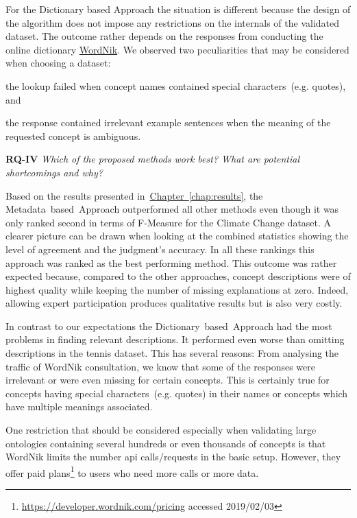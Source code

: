 For the Dictionary based Approach the situation is different because the design of the algorithm does not impose any restrictions on the internals of the validated dataset. The outcome rather depends on the responses from conducting the online dictionary \hyperref[sec:wordnik]{WordNik}. We observed two peculiarities that may be considered when choosing a dataset:
\begin{inparaenum}[i)]
	\item the lookup failed when concept names contained special characters~(e.g. quotes), and
	\item the response contained irrelevant example sentences when the meaning of the requested concept is ambiguous.
\end{inparaenum}


\textbf{RQ-IV} \emph{Which of the proposed methods work best? What are potential shortcomings and why?} 

Based on the results presented in~\hyperref[chap:results]{Chapter~\ref*{chap:results}}, the Metadata~based~Approach outperformed all other methods even though it was only ranked second in terms of F-Measure for the Climate Change dataset. A clearer picture can be drawn when looking at the combined statistics showing the level of agreement and the judgment's accuracy. In all these rankings this approach was ranked as the best performing method. This outcome was rather expected because, compared to the other approaches, concept descriptions were of highest quality while keeping the number of missing explanations at zero. Indeed, allowing expert participation produces qualitative results but is also very costly.  

In contrast to our expectations the Dictionary~based~Approach had the most problems in finding relevant descriptions. It performed even worse than omitting descriptions in the tennis dataset. This has several reasons: From analysing the traffic of WordNik consultation, we know that some of the responses were irrelevant or were even missing for certain concepts. This is certainly true for concepts having special characters~(e.g. quotes) in their names or concepts which have multiple meanings associated. 

One restriction that should be considered especially when validating large ontologies containing several hundreds or even thousands of concepts is that WordNik limits the number \gls{api} calls/requests in the basic setup. However, they offer paid plans\footnote{\url{https://developer.wordnik.com/pricing} accessed 2019/02/03} to users who need more calls or more data.

